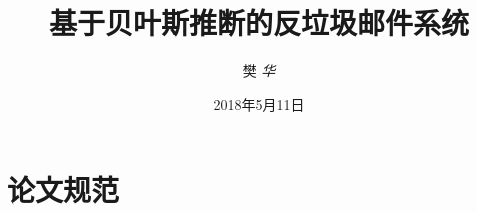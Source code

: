 \documentclass[bachelor,pdf]{ustcthesis}
\title{基于贝叶斯推断的反垃圾邮件系统}
\author{樊 \em 华}
\date{2018年5月11日}    %
\begin{document}
\maketitle

%

\frontmatter

\tableofcontents
% 

\mainmatter






\appendix
\chapter{论文规范}

\backmatter


\end{document}
